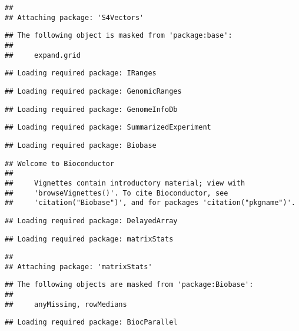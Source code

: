 \documentclass[]{article}
\begin{document}
\begin{verbatim}
## 
## Attaching package: 'S4Vectors'
\end{verbatim}

\begin{verbatim}
## The following object is masked from 'package:base':
## 
##     expand.grid
\end{verbatim}

\begin{verbatim}
## Loading required package: IRanges
\end{verbatim}

\begin{verbatim}
## Loading required package: GenomicRanges
\end{verbatim}

\begin{verbatim}
## Loading required package: GenomeInfoDb
\end{verbatim}

\begin{verbatim}
## Loading required package: SummarizedExperiment
\end{verbatim}

\begin{verbatim}
## Loading required package: Biobase
\end{verbatim}

\begin{verbatim}
## Welcome to Bioconductor
## 
##     Vignettes contain introductory material; view with
##     'browseVignettes()'. To cite Bioconductor, see
##     'citation("Biobase")', and for packages 'citation("pkgname")'.
\end{verbatim}

\begin{verbatim}
## Loading required package: DelayedArray
\end{verbatim}

\begin{verbatim}
## Loading required package: matrixStats
\end{verbatim}

\begin{verbatim}
## 
## Attaching package: 'matrixStats'
\end{verbatim}

\begin{verbatim}
## The following objects are masked from 'package:Biobase':
## 
##     anyMissing, rowMedians
\end{verbatim}

\begin{verbatim}
## Loading required package: BiocParallel
\end{verbatim}
\end{document}
